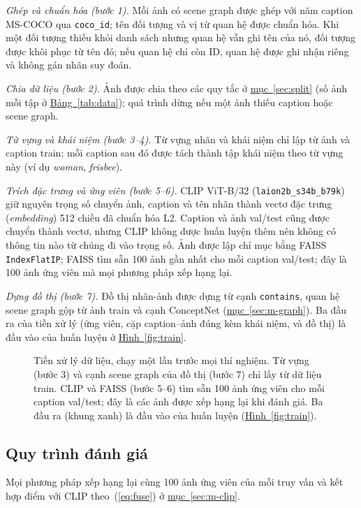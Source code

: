 \documentclass[conference]{IEEEtran}
\begin{document}
\textit{Ghép và chuẩn hóa (bước 1).} Mỗi ảnh có scene graph được ghép với năm caption MS-COCO qua \texttt{coco\_id}; tên đối tượng và vị từ quan hệ được chuẩn hóa. Khi một đối tượng thiếu khỏi danh sách nhưng quan hệ vẫn ghi tên của nó, đối tượng được khôi phục từ tên đó; nếu quan hệ chỉ còn ID, quan hệ được ghi nhận riêng và không gán nhãn suy đoán.

\textit{Chia dữ liệu (bước 2).} Ảnh được chia theo các quy tắc ở \hyperref[sec:split]{mục~\ref*{sec:split}} (số ảnh mỗi tập ở \hyperref[tab:data]{Bảng~\ref*{tab:data}}); quá trình dừng nếu một ảnh thiếu caption hoặc scene graph.

\textit{Từ vựng và khái niệm (bước 3--4).} Từ vựng nhãn và khái niệm chỉ lập từ ảnh và caption train; mỗi caption sau đó được tách thành tập khái niệm theo từ vựng này (ví dụ \emph{woman}, \emph{frisbee}).

\textit{Trích đặc trưng và ứng viên (bước 5--6).} CLIP ViT-B/32 (\texttt{laion2b\_s34b\_b79k}) giữ nguyên trọng số chuyển ảnh, caption và tên nhãn thành vectơ đặc trưng (\emph{embedding}) 512 chiều đã chuẩn hóa L2. Caption và ảnh val/test cũng được chuyển thành vectơ, nhưng CLIP không được huấn luyện thêm nên không có thông tin nào từ chúng đi vào trọng số. Ảnh được lập chỉ mục bằng FAISS \texttt{IndexFlatIP}; FAISS tìm sẵn 100 ảnh gần nhất cho mỗi caption val/test; đây là 100 ảnh ứng viên mà mọi phương pháp xếp hạng lại.

\textit{Dựng đồ thị (bước 7).} Đồ thị nhãn-ảnh được dựng từ cạnh \texttt{contains}, quan hệ scene graph gộp từ ảnh train và cạnh ConceptNet (\hyperref[sec:m-graph]{mục~\ref*{sec:m-graph}}). Ba đầu ra của tiền xử lý (ứng viên, cặp caption--ảnh đúng kèm khái niệm, và đồ thị) là đầu vào của huấn luyện ở \hyperref[fig:train]{Hình~\ref*{fig:train}}.

\begin{figure}[t]
\centering

\caption{Tiền xử lý dữ liệu, chạy một lần trước mọi thí nghiệm. Từ vựng (bước 3) và cạnh scene graph của đồ thị (bước 7) chỉ lấy từ dữ liệu train. CLIP và FAISS (bước 5--6) tìm sẵn 100 ảnh ứng viên cho mỗi caption val/test; đây là các ảnh được xếp hạng lại khi đánh giá. Ba đầu ra (khung xanh) là đầu vào của huấn luyện (\hyperref[fig:train]{Hình~\ref*{fig:train}}).}\label{fig:prep}
\end{figure}

\subsection{Quy trình đánh giá}
Mọi phương pháp xếp hạng lại cùng 100 ảnh ứng viên của mỗi truy vấn và kết hợp điểm với CLIP theo~(\ref{eq:fuse}) ở \hyperref[sec:m-clip]{mục~\ref*{sec:m-clip}}.
\end{document}
